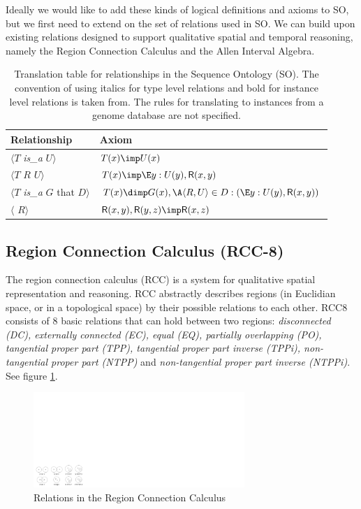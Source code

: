 \documentclass{article}
\newcommand{\tr}[1]{\textit{#1} }
\newcommand{\rel}[1]{$\langle$#1$\rangle$}
\def\isA{\tr{is\_a}}
\begin{document}
Ideally we would like to add these kinds of logical definitions and
axioms to SO, but we first need to extend on the set of relations used
in SO. We can build upon existing relations designed to support
qualitative spatial and temporal reasoning, namely the Region
Connection Calculus and the Allen Interval Algebra.

\begin{table}
\begin{tabular}{ | p{4cm} | p{7cm} | }
\hline
\textbf{Relationship} & \textbf{Axiom}  \\
\hline
\rel{$T$ \isA $U$} & $T(x) \imp U(x)$ \\
\hline
\rel{$T$ $R$ $U$} & $T(x) \imp \E y: U(y), \pr{R}(x,y)$ \\
\hline
\rel{$T$ \isA $G$ that $D$} & $T(x) \dimp G(x), \A \langle R,U \rangle \in D : ( \E y: U(y), \pr{R}(x,y) )$ \\
\hline
\rel{\pr{transitive} $R$} & $\pr{R}(x,y),\pr{R}(y,z) \imp \pr{R}(x,z)$ \\
\hline
\end{tabular}
\caption{Translation table for relationships in the Sequence Ontology (SO). The convention of using italics for type level relations and bold for instance level relations is taken from\cite{Smith2004}. 
  The rules for translating to instances from a genome database are not specified. }
\label{tab:translation-table}
\end{table}


\subsection{Region Connection Calculus (RCC-8)}

The region connection calculus (RCC) is a system for qualitative
spatial representation and reasoning. RCC abstractly describes regions
(in Euclidian space, or in a topological space) by their possible
relations to each other. RCC8 consists of 8 basic relations that can
hold between two regions: \emph{ disconnected (DC), externally
  connected (EC), equal (EQ), partially overlapping (PO), tangential
  proper part (TPP), tangential proper part inverse (TPPi),
  non-tangential proper part (NTPP)} and \emph{ non-tangential proper
  part inverse (NTPPi)}. See figure \ref{fig:RCC8}.

\begin{figure}
\center
\includegraphics[width=8cm]{RCC8}
\caption{Relations in the Region Connection Calculus}
\label{fig:RCC8}
\end{figure}
\end{document}
